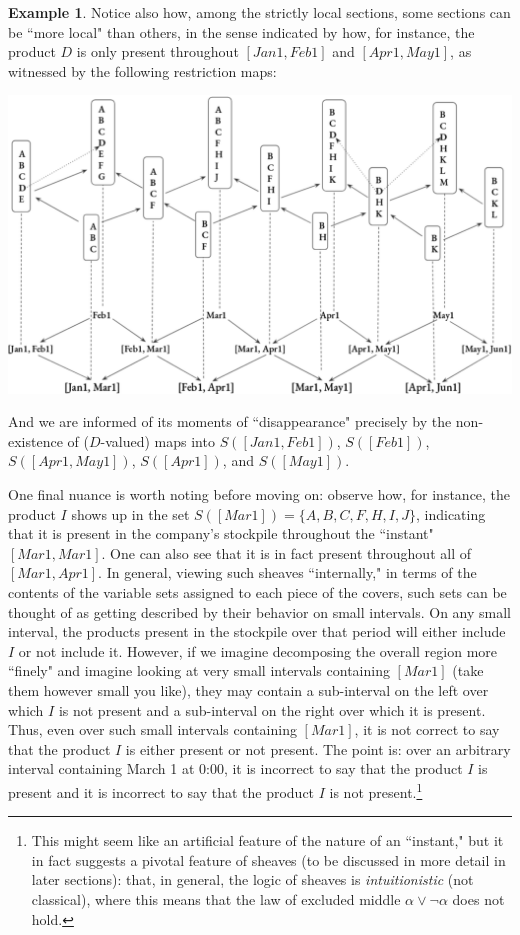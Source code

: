 \documentclass[a4paper]{book}
\theoremstyle{definition}
\newtheorem{example}{Example}[section]
\theoremstyle{definition}
\theoremstyle{definition}
\theoremstyle{theorem}
\theoremstyle{definition}
\begin{document}
\begin{example}
	Notice also how, among the strictly local sections, some sections can be ``more local" than others, in the sense indicated by how, for instance, the product $D$ is only present throughout $[Jan1, Feb1]$ and $[Apr1,May1]$, as witnessed by the following restriction maps:   
	\begin{center}
		\includegraphics*[scale=0.25]{DSmallerLocalSectionInterval.png}
	\end{center}     
	And we are informed of its moments of ``disappearance" precisely by the non-existence of ($D$-valued) maps into $S([Jan1, Feb1])$, $S([Feb1])$, $S([Apr1, May1])$, $S([Apr1])$, and $S([May1])$. \par 
	One final nuance is worth noting before moving on: observe how, for instance, the product $I$ shows up in the set $S([Mar1]) = \{A,B,C,F,H,I,J\}$, indicating that it is present in the company's stockpile throughout the ``instant" $[Mar1, Mar1]$. One can also see that it is in fact present throughout all of $[Mar1, Apr1]$. In general, viewing such sheaves ``internally," in terms of the contents of the variable sets assigned to each piece of the covers, such sets can be thought of as getting described by their behavior on small intervals. On any small interval, the products present in the stockpile over that period will either include $I$ or not include it. However, if we imagine decomposing the overall region more ``finely" and imagine looking at very small intervals containing $[Mar1]$ (take them however small you like), they may contain a sub-interval on the left over which $I$ is not present and a sub-interval on the right over which it is present. Thus, even over such small intervals containing $[Mar1]$, it is not correct to say that the product $I$ is either present or not present. The point is: over an arbitrary interval containing March 1 at 0:00, it is incorrect to say that the product $I$ is present and it is incorrect to say that the product $I$ is not present.\footnote{This might seem like an artificial feature of the nature of an ``instant," but it in fact suggests a pivotal feature of sheaves (to be discussed in more detail in later sections): that, in general, the logic of sheaves is \textit{intuitionistic} (not classical), where this means that the law of excluded middle $\alpha \vee \neg \alpha$ does not hold.}       
\end{example}
\end{document}
